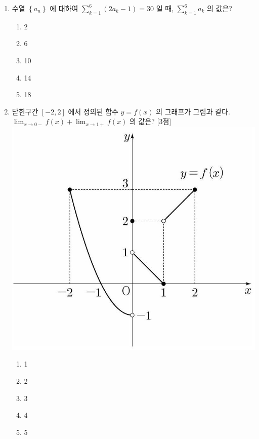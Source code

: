 \documentclass[10.5pt]{article}
\begin{document}
\begin{multicols}{2}
\begin{enumerate}
\item \leavevmode\begin{minipage}[t]{\linewidth}
수열 $\left\{a_{n}\right\}$ 에 대하여 $\sum_{k=1}^{6}\left(2 a_{k}-1\right)=30$ 일 때, $\sum_{k=1}^{6} a_{k}$ 의 값은?
\vspace{0.5em}
\begin{enumerate}[label={\textcircled{\arabic*}}, itemsep=0.2em, topsep=0.2em, leftmargin=*, align=left]
\item 2
\item 6
\item 10
\item 14
\item 18
\end{enumerate}
\par\vspace{12\baselineskip}
\end{minipage}
\item \leavevmode\begin{minipage}[t]{\linewidth}
닫힌구간 $[-2,2]$ 에서 정의된 함수 $y=f(x)$ 의 그래프가 그림과 같다. $\lim _{x \rightarrow 0-} f(x)+\lim _{x \rightarrow 1+} f(x)$ 의 값은? [3점]
\includegraphics[width=0.8\linewidth]{images/img_cf54ac5ce2d59f5127376da2222d433b.jpg}
\vspace{0.5em}
\begin{enumerate}[label={\textcircled{\arabic*}}, itemsep=0.2em, topsep=0.2em, leftmargin=*, align=left]
\item 1
\item 2
\item 3
\item 4
\item 5

\end{enumerate}
\end{minipage}
\end{enumerate}
\end{multicols}
\end{document}
